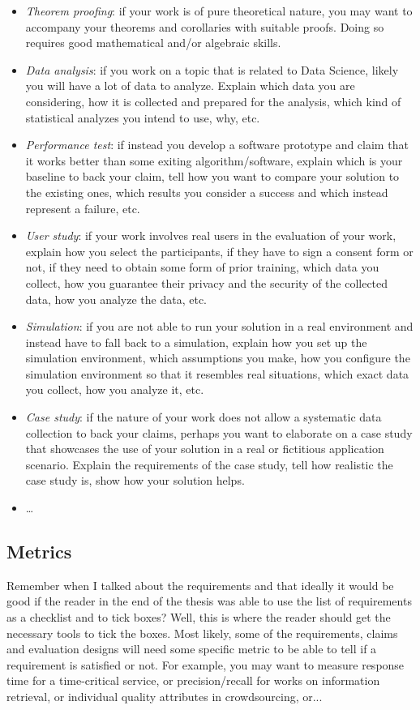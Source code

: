 \begin{itemize}
\item[\Square] \emph{Theorem proofing}: if your work is of pure theoretical nature, you may want to accompany your theorems and corollaries with suitable proofs. Doing so requires good mathematical and/or algebraic skills.
\item[\Square] \emph{Data analysis}: if you work on a topic that is related to Data Science, likely you will have a lot of data to analyze. Explain which data you are considering, how it is collected and prepared for the analysis, which kind of statistical analyzes you intend to use, why, etc.
\item[\Square] \emph{Performance test}: if instead you develop a software prototype and claim that it works better than some exiting algorithm/software, explain which is your baseline to back your claim, tell how you want to compare your solution to the existing ones, which results you consider a success and which instead represent a failure, etc.
\item[\Square] \emph{User study}: if your work involves real users in the evaluation of your work, explain how you select the participants, if they have to sign a consent form or not, if they need to obtain some form of prior training, which data you collect, how you guarantee their privacy and the security of the collected data, how you analyze the data, etc.
\item[\Square] \emph{Simulation}: if you are not able to run your solution in a real environment and instead have to fall back to a simulation, explain how you set up the simulation environment, which assumptions you make, how you configure the simulation environment so that it resembles real situations, which exact data you collect, how you analyze it, etc. 
\item[\Square] \emph{Case study}: if the nature of your work does not allow a systematic data collection to back your claims, perhaps you want to elaborate on a case study that showcases the use of your solution in a real or fictitious application scenario. Explain the requirements of the case study, tell how realistic the case study is, show how your solution helps.
\item[\Square] \dots
\end{itemize}


\subsection{Metrics}
Remember when I talked about the requirements and that ideally it would be good if the reader in the end of the thesis was able to use the list of requirements as a checklist and to tick boxes? Well, this is where the reader should get the necessary tools to tick the boxes. Most likely, some of the requirements, claims and evaluation designs will need some specific metric to be able to tell if a requirement is satisfied or not. For example, you may want to measure response time for a time-critical service, or precision/recall for works on information retrieval, or individual quality attributes in crowdsourcing, or... 


